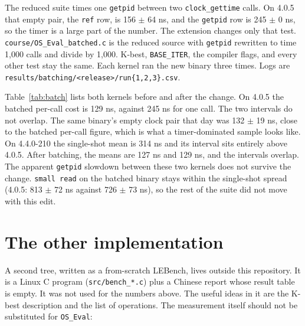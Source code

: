 \documentclass[11pt]{article}
\begin{document}
The reduced suite times one \texttt{getpid} between two \texttt{clock\_gettime} calls. On 4.0.5 that empty pair, the \texttt{ref} row, is 156 $\pm$ 64 ns, and the \texttt{getpid} row is 245 $\pm$ 0 ns, so the timer is a large part of the number. The extension changes only that test. \texttt{course/OS\_Eval\_batched.c} is the reduced source with \texttt{getpid} rewritten to time 1{,}000 calls and divide by 1{,}000. K-best, \texttt{BASE\_ITER}, the compiler flags, and every other test stay the same. Each kernel ran the new binary three times. Logs are \texttt{results/batching/<release>/run\{1,2,3\}.csv}.

\begin{table}[ht]
\centering
\caption{Mean $\pm$ sample standard deviation of three K-best runs. Single-shot numbers are the reduced sweep; batched numbers are the one-line change above.}
\label{tab:batch}

\end{table}

Table~\ref{tab:batch} lists both kernels before and after the change. On 4.0.5 the batched per-call cost is 129 ns, against 245 ns for one call. The two intervals do not overlap. The same binary's empty clock pair that day was 132 $\pm$ 19 ns, close to the batched per-call figure, which is what a timer-dominated sample looks like. On 4.4.0-210 the single-shot mean is 314 ns and its interval sits entirely above 4.0.5. After batching, the means are 127 ns and 129 ns, and the intervals overlap. The apparent \texttt{getpid} slowdown between these two kernels does not survive the change. \texttt{small read} on the batched binary stays within the single-shot spread (4.0.5: 813 $\pm$ 72 ns against 726 $\pm$ 73 ns), so the rest of the suite did not move with this edit.

\section{The other implementation}
\label{sec:rewrite}

A second tree, written as a from-scratch LEBench, lives outside this repository. It is a Linux C program (\texttt{src/bench\_*.c}) plus a Chinese report whose result table is empty. It was not used for the numbers above. The useful ideas in it are the K-best description and the list of operations. The measurement itself should not be substituted for \texttt{OS\_Eval}:
\end{document}
